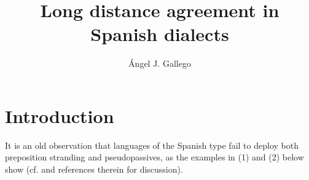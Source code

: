\documentclass[output=paper]{langsci/langscibook}
\author{Ángel J. Gallego\affiliation{Universitat Autònoma de Barcelona}}
\title{Long distance agreement in Spanish dialects}
\begin{document}
 

 

 

 

 

 

 

 

 

 

 


\section{Introduction}%

It is an old observation that languages of the Spanish type fail to deploy both preposition stranding and pseudopassives, as the examples in (1) and (2) below show (cf. \citealt{Law2006} and references therein for discussion). 

    \z
\end{document}
